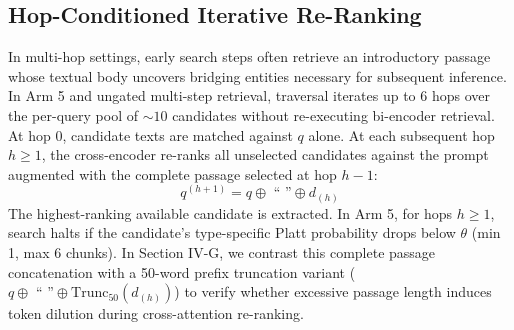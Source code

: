 \documentclass{article}
\begin{document}
\subsection{Hop-Conditioned Iterative Re-Ranking}
In multi-hop settings, early search steps often retrieve an introductory passage whose textual body uncovers bridging entities necessary for subsequent inference. In Arm 5 and ungated multi-step retrieval, traversal iterates up to 6 hops over the per-query pool of $\sim 10$ candidates without re-executing bi-encoder retrieval. At hop 0, candidate texts are matched against $q$ alone. At each subsequent hop $h \ge 1$, the cross-encoder re-ranks all unselected candidates against the prompt augmented with the complete passage selected at hop $h-1$:
\begin{equation}
    q^{(h+1)} = q \oplus \text{ `` ''} \oplus d_{(h)}
\end{equation}
The highest-ranking available candidate is extracted. In Arm 5, for hops $h \ge 1$, search halts if the candidate's type-specific Platt probability drops below $\theta$ (min 1, max 6 chunks). In Section IV-G, we contrast this complete passage concatenation with a 50-word prefix truncation variant ($q \oplus \text{ `` ''} \oplus \text{Trunc}_{50}(d_{(h)})$) to verify whether excessive passage length induces token dilution during cross-attention re-ranking.
\end{document}
